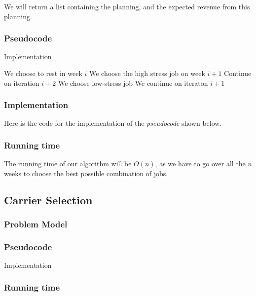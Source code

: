 \documentclass{article}
\begin{document}
We will return a list containing the planning, and the expected revenue from this planning.

\subsubsection*{Pseudocode}

\begin{algorithm}[H]
\caption{Implementation}
\begin{algorithmic}[1]
  \State We choose to rest in week $i$
  \State We choose the high stress job on week $i+1$
  \State Continue on iteration $i+2$
 \Else
  \State We choose low-stress job
  \State We continue on iteraton $i+1$
 \EndIf
\EndFor
\end{algorithmic}
\end{algorithm}

\subsubsection*{Implementation}

Here is the code for the implementation of the \textit{pseudocode} shown below.



\subsubsection*{Running time}

The running time of our algorithm will be $O(n)$, as we have to go over all the $n$ weeks to choose the best possible combination of jobs.


\subsection*{Carrier Selection}

\subsubsection*{Problem Model}

\subsubsection*{Pseudocode}

\begin{algorithm}[H]
\caption{Implementation}
\begin{algorithmic}[1]
\end{algorithmic}
\end{algorithm}

\subsubsection*{Running time}
\end{document}
